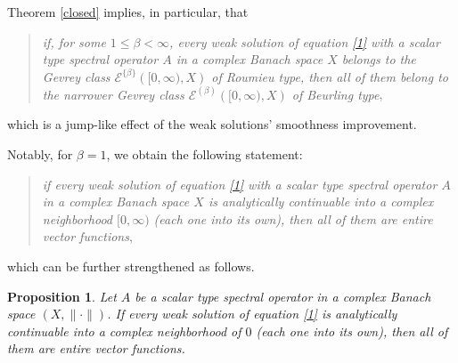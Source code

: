 \documentclass{amsart}
\theoremstyle{plain}
\newtheorem{prop}{Proposition}[section]
\theoremstyle{definition}
\begin{document}
Theorem \ref{closed} implies, in particular, that
\begin{quote}
\textit{if, for some $ 1\le \beta<\infty$, every weak solution of equation \eqref{1} with a scalar type spectral operator $A$ in a complex Banach space $X$ belongs to the Gevrey class 
${\mathscr E}^{\{\beta\}}\left([0,\infty),X\right)$
of Roumieu type, then all of them belong to the narrower Gevrey class
${\mathscr E}^{(\beta)}\left([0,\infty),X\right)$
of Beurling type},
\end{quote} 
which is a jump-like effect of the weak solutions' smoothness improvement.

Notably, for $\beta =1$, we obtain the following statement: 
\begin{quote}
\textit{if every weak solution of equation \eqref{1} with a scalar type spectral operator $A$ in a complex Banach space $X$ is analytically continuable into a complex neighborhood $[0,\infty)$ (each one into its own), then all of them are entire vector functions},
\end{quote}
which can be further strengthened as follows.

\begin{prop}\label{smimp}
Let $A$ be a scalar type spectral operator in a complex Banach space $(X,\|\cdot\|)$. If every weak solution of equation \eqref{1} is analytically continuable into a complex neighborhood of $0$ (each one into its own), then all of them are entire vector functions.
\end{prop}
\end{document}
